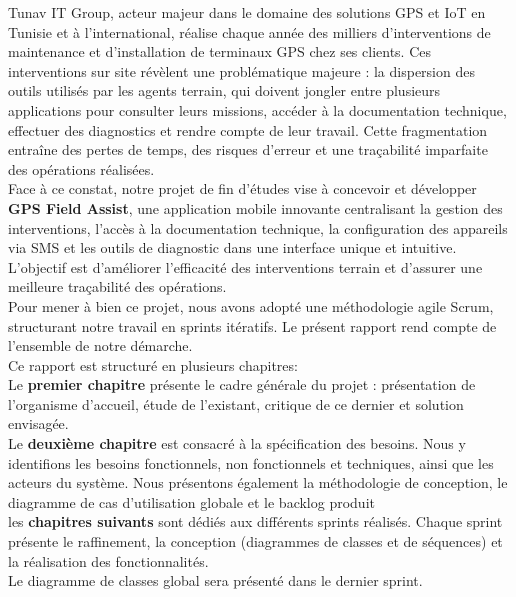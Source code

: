 \documentclass[12pt,a4paper]{report}
\begin{document}
\noindent Tunav IT Group, acteur majeur dans le domaine des solutions GPS et IoT en Tunisie et à l'international, réalise chaque année des milliers d'interventions de maintenance et d'installation de terminaux GPS chez ses clients.
 Ces interventions sur site révèlent une problématique majeure : la dispersion des outils utilisés par les agents terrain, qui doivent jongler entre plusieurs applications pour consulter leurs missions, accéder à la documentation technique, effectuer des diagnostics et rendre compte de leur travail. Cette fragmentation entraîne des pertes de temps, des risques d'erreur et une traçabilité imparfaite des opérations réalisées.\\[0.3cm]
\noindent Face à ce constat, notre projet de fin d'études vise à concevoir et développer  \textbf{GPS Field Assist}, une application mobile innovante centralisant la gestion des interventions, l'accès à la documentation technique, la configuration des appareils via SMS et les outils de diagnostic dans une interface unique et intuitive. L'objectif est d'améliorer l'efficacité des interventions terrain et d'assurer une meilleure traçabilité des opérations.\\[0.3cm]
\noindent Pour mener à bien ce projet, nous avons adopté une méthodologie agile Scrum, structurant notre travail en sprints itératifs. Le présent rapport rend  compte de l'ensemble de notre démarche.\\[0.3cm]

\noindent Ce rapport est structuré en   plusieurs chapitres:\\[0.1cm]

\noindent Le \textbf{premier chapitre} présente le cadre générale du projet : présentation de l'organisme d'accueil, étude de l'existant, critique de ce dernier et solution envisagée.\\[0.1cm]
\noindent Le \textbf{deuxième chapitre} est consacré à la spécification des besoins. Nous y identifions les besoins fonctionnels, non fonctionnels et techniques, ainsi que les acteurs du système. Nous présentons également la méthodologie de conception, le diagramme de cas d'utilisation globale et le backlog produit\\[0.1cm]

\noindent les \textbf{chapitres suivants} sont dédiés aux différents sprints réalisés. Chaque sprint présente le raffinement, la conception (diagrammes de classes et de séquences) et la réalisation des fonctionnalités. \\[0.1cm]
\noindent Le diagramme de classes global sera présenté dans le dernier sprint.\\[0.1cm]
\end{document}
